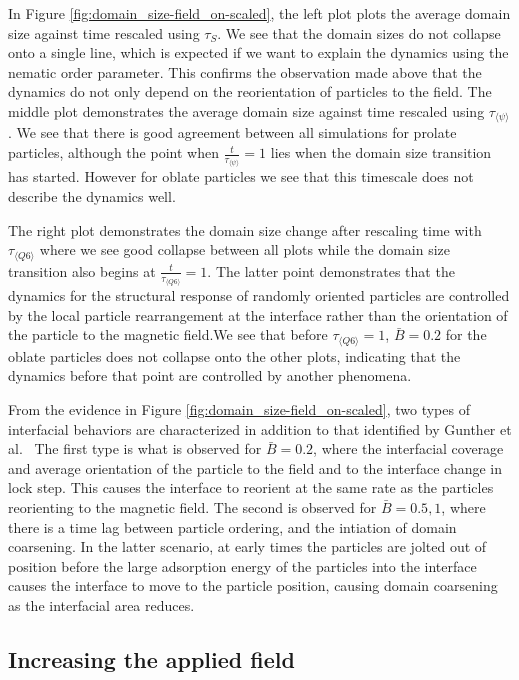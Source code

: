 In Figure \ref{fig:domain_size-field_on-scaled}, the left plot plots the
average domain size against time rescaled using \(\tau_S\). We see that
the domain sizes do not collapse onto a single line, which is expected
if we want to explain the dynamics using the nematic order parameter.
This confirms the observation made above that the dynamics do not only
depend on the reorientation of particles to the field. The middle plot
demonstrates the average domain size against time rescaled using
\(\tau_{\langle \psi \rangle}\). We see that there is good agreement
between all simulations for prolate particles, although the point when
\(\frac{t}{\tau_{\langle \psi \rangle}} = 1\) lies when the domain size
transition has started. However for oblate particles we see that this
timescale does not describe the dynamics well.

The right plot demonstrates the domain size change after rescaling time
with \(\tau_{\langle Q6 \rangle}\) where we see good collapse between
all plots while the domain size transition also begins at
\(\frac{t}{\tau_{\langle Q6 \rangle}} = 1\). The latter point
demonstrates that the dynamics for the structural response of randomly
oriented particles are controlled by the local particle rearrangement at
the interface rather than the orientation of the particle to the
magnetic field.We see that before \(\tau_{\langle Q6 \rangle} = 1\),
\(\bar{B} = 0.2\) for the oblate particles does not collapse onto the
other plots, indicating that the dynamics before that point are
controlled by another phenomena.

From the evidence in Figure \ref{fig:domain_size-field_on-scaled}, two
types of interfacial behaviors are characterized in addition to that
identified by Gunther et al.~\cite{gunther_timescales_2014} The first
type is what is observed for \(\bar{B} = 0.2\), where the interfacial
coverage and average orientation of the particle to the field and to the
interface change in lock step. This causes the interface to reorient at
the same rate as the particles reorienting to the magnetic field. The
second is observed for \(\bar{B} = 0.5, 1\), where there is a time lag
between particle ordering, and the intiation of domain coarsening. In
the latter scenario, at early times the particles are jolted out of
position before the large adsorption energy of the particles into the
interface causes the interface to move to the particle position, causing
domain coarsening as the interfacial area reduces.

\subsection{Increasing the applied
field}\label{increasing-the-applied-field}

